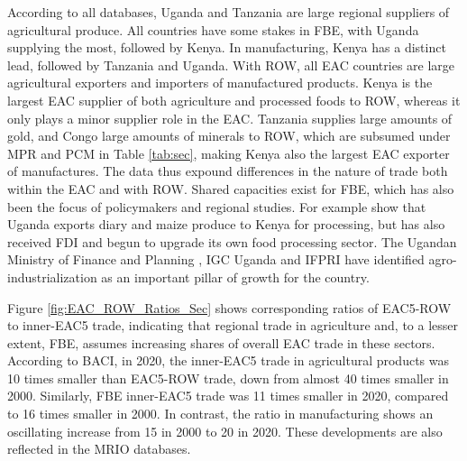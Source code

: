 \documentclass[a4paper]{article}
\begin{document}
According to all databases, Uganda and Tanzania are large regional suppliers of agricultural produce. All countries have some stakes in FBE, with Uganda supplying the most, followed by Kenya. In manufacturing, Kenya has a distinct lead, followed by Tanzania and Uganda. With ROW, all EAC countries are large agricultural exporters and importers of manufactured products. Kenya is the largest EAC supplier of both agriculture and processed foods to ROW, whereas it only plays a minor supplier role in the EAC. Tanzania supplies large amounts of gold, and Congo large amounts of minerals to ROW, which are subsumed under MPR and PCM in Table \ref{tab:sec}, making Kenya also the largest EAC exporter of manufactures. The data thus expound differences in the nature of trade both within the EAC and with ROW. Shared capacities exist for FBE, which has also been the focus of policymakers and regional studies. For example \citet{Daly2017RVCs} show that Uganda exports diary and maize produce to Kenya for processing, but has also received FDI and begun to upgrade its own food processing sector. The Ugandan Ministry of Finance and Planning \citep{EGF21}, IGC Uganda \citep{fowler2019agro} and IFPRI \citep{van2020institutional} have identified agro-industrialization as an important pillar of growth for the country. \newline


Figure \ref{fig:EAC_ROW_Ratios_Sec} shows corresponding ratios of EAC5-ROW to inner-EAC5 trade, indicating that regional trade in agriculture and, to a lesser extent, FBE, assumes increasing shares of overall EAC trade in these sectors. According to BACI, in 2020, the inner-EAC5 trade in agricultural products was 10 times smaller than EAC5-ROW trade, down from almost 40 times smaller in 2000. Similarly, FBE inner-EAC5 trade was 11 times smaller in 2020, compared to 16 times smaller in 2000. In contrast, the ratio in manufacturing shows an oscillating increase from 15 in 2000 to 20 in 2020. These developments are also reflected in the MRIO databases. \newline
\end{document}
